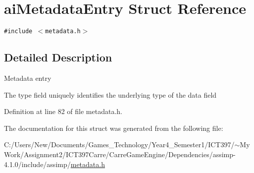 \hypertarget{structai_metadata_entry}{
\section{aiMetadataEntry Struct Reference}
\label{structai_metadata_entry}
}
{\tt \#include $<$metadata.h$>$}



\subsection{Detailed Description}
Metadata entry

The type field uniquely identifies the underlying type of the data field 

Definition at line 82 of file metadata.h.

The documentation for this struct was generated from the following file:\begin{CompactItemize}
\item 
C:/Users/New/Documents/Games\_\-Technology/Year4\_\-Semester1/ICT397/$\sim$My Work/Assignment2/ICT397Carre/CarreGameEngine/Dependencies/assimp-4.1.0/include/assimp/\hyperlink{metadata_8h}{metadata.h}\end{CompactItemize}
